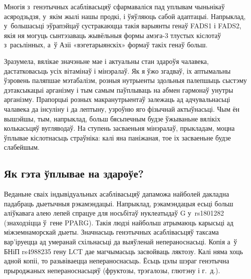 Многія з~генэтычных асаблівасьцяў сфармаваліся пад уплывам чыньнікаў асяродзьдзя, у~якім жылі нашы продкі, і ўяўляюць сабой адаптацыі. Напрыклад, у~большасьці эўрапэйцаў сустракаюцца такія варыянты генаў FADS1 і FADS2, якія ня могуць сынтэзаваць жывёльныя формы амэга-3 тлустых кіслотаў з~расьлінных, а~ў Азіі «вэгетарыянскіх» формаў такіх генаў больш.

Зразумела, вялікае значэньне мае і актуальны стан здароўя чалавека, дастатковасьць усіх вітамінаў і мінэралаў. Як я ўжо згадваў, іх аптымальны ўзровень паляпшае мэтабалізм, розныя нутрыенты здольныя палепшыць сыстэму дэтаксыкацыі арганізму і тым самым паўплываць на абмен гармонаў унутры арганізму. Прапорцыі розных макранутрыентаў залежаць ад адчувальнасьці чалавека да інсуліну і да лептыну, узроўню яго фізычнай актыўнасьці. Чым ён вышэйшы, тым, напрыклад, больш бясьпечным будзе ўжываньне вялікіх колькасьцяў вугляводаў. На ступень засваеньня мінэралаў, прыкладам, моцна ўплывае кіслотнасьць страўніка: калі яна паніжаная, тое іх засваеньне будзе слабейшым.

\subsection{Як гэта ўплывае на здароўе?}

Веданьне сваіх індывідуальных асаблівасьцяў дапаможа найболей дакладна падабраць дыетычныя рэкамэндацыі. Напрыклад, рэкамэндацыя есьці больш аліўкавага алею лепей спрацуе для носьбітаў нуклеатыдаў G у~rs1801282 (знаходзіцца ў~гене PPARG). Такія людзі найбольш атрымаюць карысьці ад міжземнаморскай дыеты. Значнасьць генэтычных асаблівасьцяў таксама вар'іруецца ад умеранай схільнасьці да выяўленай непераноснасьці. Копія а~ў БНіП rs4988235 гену LCT дае магчымасьць засвойваць ляктозу. Калі няма хоць адной копіі, то разьвіваецца непераноснасьць. Ёсьць цэлы шэраг генэтычна прыроджаных непераноснасьцяў (фруктозы, трэгалозы, глютэну і г.~д.).


